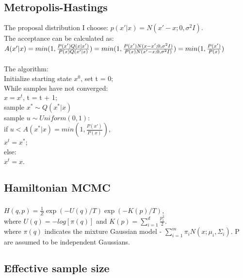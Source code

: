 \documentclass{article}
\begin{document}
\subsection{Metropolis-Hastings}
The proposal distribution I choose: $p(x' | x) = N(x'-x; 0, \sigma^2I)$.\\
The acceptance can be calculated as: \\
$
A(x'|x) = min(1, \frac{P(x')Q(x|x')}{P(x)Q(x'|x)}) \\
= min(1, \frac{P(x')N(x-x'; 0, \sigma^2I)}{P(x)N(x'-x; 0, \sigma^2I)}) \\
= min(1, \frac{P(x')}{P(x)})
$
\\
\\
The algorithm: \\
Initialize starting state $x^0$, set t = 0;\\
While samples have not converged:\\
$x = x^t$, t = t + 1;\\
sample $x^* \sim Q(x^*|x)$ \\
sample $u \sim Uniform(0, 1)$: \\
if $u < A(x^*|x) = min(1, \frac{P(x')}{P(x)})$, \\
$x^t = x^*$;\\
else: \\
$x^t = x$.

\subsection{Hamiltonian MCMC}
\subsubsection{}
$
H(q, p) = \frac{1}{Z}\exp(-U(q)/T)\exp(-K(p)/T)
$, \\
where $U(q) = -log[\pi(q)]$ and $K(p) = \sum_{i=1}^d \frac{p_i^2}{2}$. \\
where $\pi(q)$ indicates the mixture Gaussian model - $\sum_{i=1}^m \pi_i N(x; \mu_i, \Sigma_i)$. P are assumed to be independent Gaussians.

\subsubsection{}



\subsection{Effective sample size}
\end{document}
